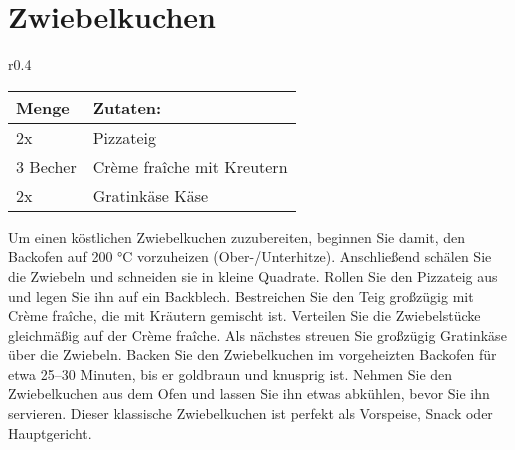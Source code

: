 \section{Zwiebelkuchen}
\begin{wraptable}{r}{0.4\textwidth}
    \centering
    \begin{tabularx}{0.39\textwidth}{|l|X|}
        \hline
        Menge & Zutaten: \\
        \hline
        2x & Pizzateig \\
        \hline
        3 Becher & Crème fraîche mit Kreutern \\
        \hline
        2x & Gratinkäse Käse\\
        \hline
    \end{tabularx}
\end{wraptable}
Um einen köstlichen Zwiebelkuchen zuzubereiten, beginnen Sie damit, den Backofen auf 200 °C vorzuheizen (Ober-/Unterhitze). 
Anschließend schälen Sie die Zwiebeln und schneiden sie in kleine Quadrate. 
Rollen Sie den Pizzateig aus und legen Sie ihn auf ein Backblech. 
Bestreichen Sie den Teig großzügig mit Crème fraîche, die mit Kräutern gemischt ist. 
Verteilen Sie die Zwiebelstücke gleichmäßig auf der Crème fraîche. 
Als nächstes streuen Sie großzügig Gratinkäse über die Zwiebeln. 
Backen Sie den Zwiebelkuchen im vorgeheizten Backofen für etwa 25–30 Minuten, bis er goldbraun und knusprig ist. 
Nehmen Sie den Zwiebelkuchen aus dem Ofen und lassen Sie ihn etwas abkühlen, bevor Sie ihn servieren. 
Dieser klassische Zwiebelkuchen ist perfekt als Vorspeise, Snack oder Hauptgericht.
\newpage
